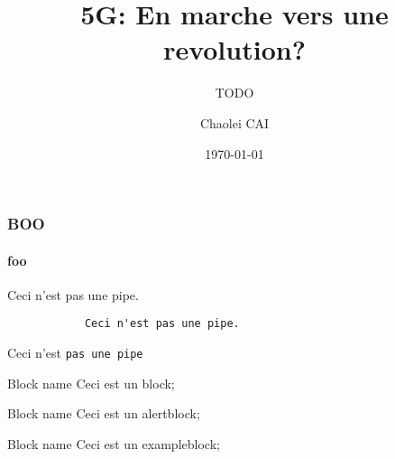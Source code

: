 \documentclass{beamer}
\subtitle{TODO}
\title{5G: En marche vers une revolution?}
\institute[Paris 8]{Paris VIII}
\author{Chaolei CAI}
\date{\today}
\begin{document}
    \frame{\titlepage}
    \tableofcontents

    \begin{frame}[fragile]%
        \frametitle{BOO}
        \framesubtitle{foo}
        Ceci n'est pas une pipe.
        \begin{verbatim}
            Ceci n'est pas une pipe.
        \end{verbatim}
            Ceci n'est \texttt{pas une pipe}
    \end{frame}

    \begin{frame}
        \begin{block}{Block name}
            Ceci est un block;
        \end{block}
        \begin{alertblock}{Block name}
            Ceci est un alertblock;
        \end{alertblock}
        \begin{exampleblock}{Block name}
            Ceci est un exampleblock;
        \end{exampleblock}

    \end{frame}
\end{document}
